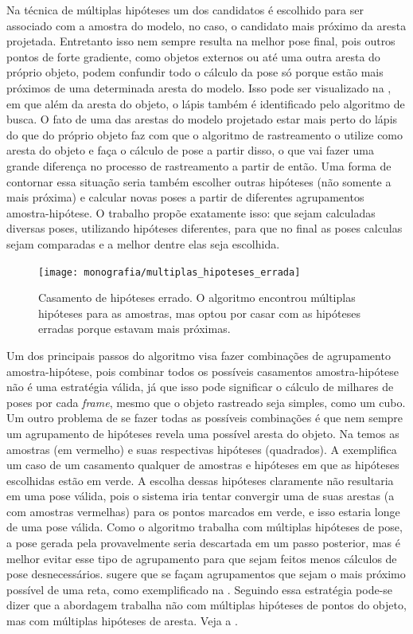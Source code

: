 Na técnica de múltiplas hipóteses um dos candidatos é escolhido para ser associado com a amostra do modelo, no caso, o candidato mais próximo da aresta projetada. Entretanto isso nem sempre resulta na melhor pose final, pois outros pontos de forte gradiente, como objetos externos ou até uma outra aresta do próprio objeto, podem confundir todo o cálculo da pose só porque estão mais próximos de uma determinada aresta do modelo. Isso pode ser visualizado na , em que além da aresta do objeto, o lápis também é identificado pelo algoritmo de busca. O fato de uma das arestas do modelo projetado estar mais perto do lápis do que do próprio objeto faz com que o algoritmo de rastreamento o utilize como aresta do objeto e faça o cálculo de pose a partir disso, o que vai fazer uma grande diferença no processo de rastreamento a partir de então. Uma forma de contornar essa situação seria também escolher outras hipóteses (não somente a mais próxima) e calcular novas poses a partir de diferentes agrupamentos amostra-hipótese. O trabalho \cite{celine} propõe exatamente isso: que sejam calculadas diversas poses, utilizando hipóteses diferentes, para que no final as poses calculas sejam comparadas e a melhor dentre elas seja escolhida.

\begin{figure}[!ht]
\centering\texttt{[image: monografia/multiplas\_hipoteses\_errada]}
\caption{Casamento de hipóteses errado. O algoritmo encontrou múltiplas hipóteses para as amostras, mas optou por casar com as hipóteses erradas porque estavam mais próximas.}
\label{multiplas_hipoteses_errada}
\end{figure}

Um dos principais passos do algoritmo visa fazer combinações de agrupamento amostra-hipótese, pois combinar todos os possíveis casamentos amostra-hipótese não é uma estratégia válida, já que isso pode significar o cálculo de milhares de poses por cada \emph{frame}, mesmo que o objeto rastreado seja simples, como um cubo. Um outro problema de se fazer todas as possíveis combinações é que nem sempre um agrupamento de hipóteses revela uma possível aresta do objeto. Na  temos as amostras (em vermelho) e suas respectivas hipóteses (quadrados). A  exemplifica um caso de um casamento qualquer de amostras e hipóteses em que as hipóteses escolhidas estão em verde. A escolha dessas hipóteses claramente não resultaria em uma pose válida, pois o sistema iria tentar convergir uma de suas arestas (a com amostras vermelhas) para os pontos marcados em verde, e isso estaria longe de uma pose válida. Como o algoritmo trabalha com múltiplas hipóteses de pose, a pose gerada pela  provavelmente seria descartada em um passo posterior, mas é melhor evitar esse tipo de agrupamento para que sejam feitos menos cálculos de pose desnecessários. \cite{celine} sugere que se façam agrupamentos que sejam o mais próximo possível de uma reta, como exemplificado na . Seguindo essa estratégia pode-se dizer que a abordagem trabalha não com múltiplas hipóteses de pontos do objeto, mas com múltiplas hipóteses de aresta. Veja a .

